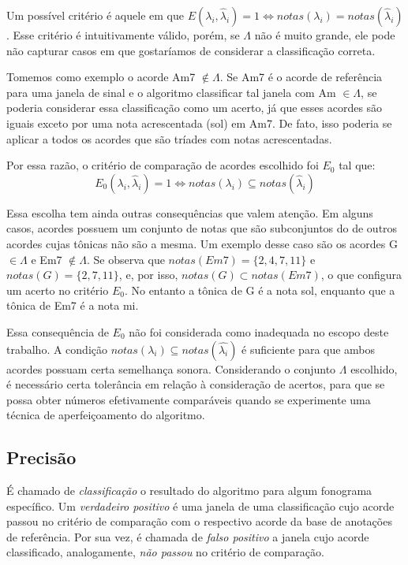         Um possível critério é aquele em que $E(\lambda_i, \hat{\lambda}_i) = 1 \Leftrightarrow notas(\lambda_i) = notas(\hat{\lambda}_i)$. Esse critério é intuitivamente válido, porém, se $\Lambda$ não é muito grande, ele pode não capturar casos em que gostaríamos de considerar a classificação correta.
        
        Tomemos como exemplo o acorde Am7 $\notin \Lambda$. Se Am7 é o acorde de referência para uma janela de sinal e o algoritmo classificar tal janela com Am $\in \Lambda$, se poderia considerar essa classificação como um acerto, já que esses acordes são iguais exceto por uma nota acrescentada (sol) em Am7. De fato, isso poderia se aplicar a todos os acordes que são tríades com notas acrescentadas.
        
        Por essa razão, o critério de comparação de acordes escolhido foi $E_0$ tal que:
        \[
            E_0(\lambda_i, \hat{\lambda}_i) = 1 \Leftrightarrow notas(\lambda_i) \subseteq notas(\hat{\lambda}_i)
        \]
        
        Essa escolha tem ainda outras consequências que valem atenção. Em alguns casos, acordes possuem um conjunto de notas que são subconjuntos do de outros acordes cujas tônicas não são a mesma. Um exemplo desse caso são os acordes G $\in \Lambda$ e Em7 $\notin \Lambda$. Se observa que $notas(Em7) = \{ 2, 4, 7, 11 \}$ e $notas(G) = \{ 2, 7, 11 \}$, e, por isso, $notas(G) \subset notas(Em7)$, o que configura um acerto no critério $E_0$. No entanto a tônica de G é a nota sol, enquanto que a tônica de Em7 é a nota mi.
        
        Essa consequência de $E_0$ não foi considerada como inadequada no escopo deste trabalho. A condição $notas(\lambda_i) \subseteq notas(\hat{\lambda_i})$ é suficiente para que ambos acordes possuam certa semelhança sonora. Considerando o conjunto $\Lambda$ escolhido, é necessário certa tolerância em relação à consideração de acertos, para que se possa obter números efetivamente comparáveis quando se experimente uma técnica de aperfeiçoamento do algoritmo.
        
    
    \subsection{Precisão}
        É chamado de \textit{classificação} o resultado do algoritmo para algum fonograma específico. Um \textit{verdadeiro positivo} é uma janela de uma classificação cujo acorde passou no critério de comparação com o respectivo acorde da base de anotações de referência. Por sua vez, é chamada de \textit{falso positivo} a janela cujo acorde classificado, analogamente, \textit{não passou} no critério de comparação.
        
